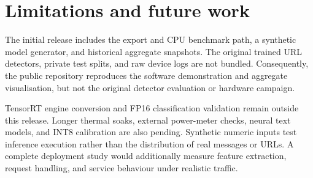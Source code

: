 \section{Limitations and future work}
The initial release includes the export and CPU benchmark path, a synthetic model generator, and historical aggregate snapshots. The original trained URL detectors, private test splits, and raw device logs are not bundled. Consequently, the public repository reproduces the software demonstration and aggregate visualisation, but not the original detector evaluation or hardware campaign.

TensorRT engine conversion and FP16 classification validation remain outside this release. Longer thermal soaks, external power-meter checks, neural text models, and INT8 calibration are also pending. Synthetic numeric inputs test inference execution rather than the distribution of real messages or URLs. A complete deployment study would additionally measure feature extraction, request handling, and service behaviour under realistic traffic.

